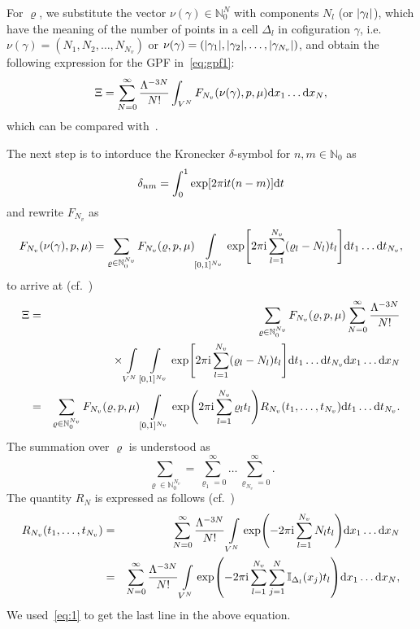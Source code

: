 \documentclass[12pt]{article}
\numberwithin{equation}{section}
\begin{document}
	For $\varrho$, we substitute the vector $\nu(\gamma) \in \mathbb{N}_0^N$ with components $N_l$ (or $\abs{\gamma_l}$), which have the meaning of the number of points in a cell $\Delta_{l}$ in cofiguration $\gamma$, i.e. $\nu(\gamma)=(N_1, N_2, \ldots, N_{N_v})$ or $\nu(\gamma) = (\abs{\gamma_1}, \abs{\gamma_2}, \ldots, \abs{\gamma_{N_v}})$, and obtain the following expression for the GPF in~\eqref{eq:gpf1}:
	\begin{equation}
		\Xi = \sum_{N=0}^{\infty} \frac{\Lambda^{-3N}}{N!}\int_{V^N} F_{N_v}(\nu(\gamma),p,\mu) {\rm d} x_1 \dotsc {\rm d} x_N,
	\end{equation}
	which can be compared with~\cite[eq.~(2.8)]{KKD20}.
	
	The next step is to intorduce the Kronecker $\delta$-symbol for $n, m \in \mathbb{N}_0$ as
	\begin{equation}
		\delta_{nm} = \int_0^1 \exp[2\pi {\rm i} t (n-m)] {\rm d}t
	\end{equation}
	and rewrite $F_{N_v}$ as
	\begin{equation}
		F_{N_v}(\nu(\gamma),p,\mu) = \sum_{\varrho \in \mathbb{N}_0^{N_v}} F_{N_v}(\varrho, p, \mu) 
		\int\limits_{[0,1]^{N_v}} \exp[2\pi{\rm i} \sum_{l=1}^{N_v} (\varrho_l - N_l)t_l ] {\rm d} t_1 \ldots {\rm d} t_{N_v},
	\end{equation}
	to arrive at (cf.~\cite[(2.9)]{KKD20})
	\begin{eqnarray}
		\label{eq:XiR}
		\Xi & = &  \sum_{\varrho \in \mathbb{N}_0^{N_v}} F_{N_v}(\varrho, p, \mu) 
		\sum_{N=0}^{\infty} \frac{\Lambda^{-3N}}{N!} 
		\nonumber\\
		&& \times \int\limits_{V^N} \int\limits_{[0,1]^{N_v}} 
		\exp[2\pi{\rm i} \sum_{l=1}^{N_v} (\varrho_l - N_l)t_l ] {\rm d} t_1 \ldots {\rm d} t_{N_v} {\rm d}x_1 \ldots {\rm d}x_N 
		\nonumber\\
		& = & \sum_{\varrho \in \mathbb{N}_0^{N_v}} F_{N_v}(\varrho, p, \mu)
		\int\limits_{[0,1]^{N_v}} \exp(2\pi{\rm i} \sum_{l=1}^{N_v} \varrho_l t_l) R_{N_v}(t_1, \ldots, t_{N_v}) {\rm d} t_1 \ldots {\rm d} t_{N_v}.
	\end{eqnarray}
	The summation over $\varrho$ is understood as
	\begin{equation}
		\sum_{\varrho \in \mathbb{N}_0^{N_v}} = \sum_{\varrho_1=0}^{\infty} \ldots \sum_{\varrho_{N_v}=0}^{\infty}.
	\end{equation}
	The quantity $R_N$ is expressed as follows (cf.~\cite[(2.10)]{KKD20})
	\begin{eqnarray}
		\label{def:RN}
		R_{N_v}(t_1, \ldots, t_{N_v}) & = & \sum_{N=0}^{\infty} \frac{\Lambda^{-3N}}{N!} \int\limits_{V^N} \exp(-2\pi{\rm i} \sum_{l=1}^{N_v} N_l t_l) {\rm d}x_1 \ldots {\rm d}x_N
		\nonumber\\
		&=& \sum_{N=0}^{\infty} \frac{\Lambda^{-3N}}{N!} \int\limits_{V^N} \exp(-2\pi{\rm i} \sum_{l=1}^{N_v} \sum_{j=1}^{N} \mathbb{I}_{\Delta_{l}}(x_j) t_l) {\rm d}x_1 \ldots {\rm d}x_N,
	\end{eqnarray}
	We used~\eqref{eq:1} to get the last line in the above equation.
	
\end{document}

